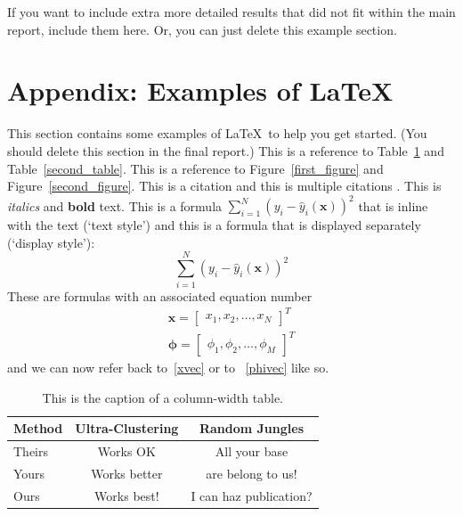 \documentclass[10pt,twocolumn,letterpaper]{article}
\begin{document}
If you want to include extra more detailed results that did not fit within the main report, include them here. Or, you can just delete this example section.

\section*{Appendix: Examples of \LaTeX}


This section contains some examples of \LaTeX~to help you get started.
(You should delete this section in the final report.)
This is a reference to Table~\ref{first_table} and Table~\ref{second_table}.
This is a reference to Figure~\ref{first_figure} and Figure~\ref{second_figure}.
This is a citation \cite{breiman2001statistical} and this is
multiple citations \cite{breiman2001statistical,bishop2006pattern}.
This is \textit{italics} and \textbf{bold} text.
This is a formula $\sum_{i=1}^N (y_i - \hat{y}_i(\mathbf{x}))^2$
that is inline with the text (`text style') and this is a
formula that is displayed separately (`display style'):
$$
\sum_{i=1}^N (y_i - \hat{y}_i(\mathbf{x}))^2
$$
These are formulas with an associated equation number
\begin{align}
   \mathbf{x} = \begin{bmatrix}
      x_1, x_2, \ldots, x_N
   \end{bmatrix}^T    \label{xvec}\\
   \boldsymbol{\phi} = \begin{bmatrix}
      \phi_1, \phi_2, \ldots, \phi_M
   \end{bmatrix}^T    \label{phivec}
\end{align}
and we can now refer back to~\eqref{xvec} or to ~\eqref{phivec} like so.



\begin{table}
   \begin{center}
   \begin{tabular}{|l|c|c|}
   \hline
   Method & Ultra-Clustering & Random Jungles \\
   \hline\hline
   Theirs & Works OK & All your base\\
   Yours & Works better & are belong to us!\\
   Ours & Works best! & I can haz publication?\\
   \hline
   \end{tabular}
   \end{center}
   \caption{This is the caption of a column-width table.\label{first_table}}
\end{table}
\end{document}
